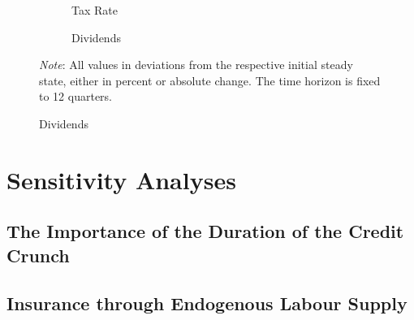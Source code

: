 \documentclass[12pt]{article} %
\numberwithin{equation}{section} %
\begin{document}
\begin{figure}[H]
    \ContinuedFloat
    \caption*{Figure {\hypersetup{hidelinks}\ref{fig:baseline-permanent-limit-agg}} Continued}
    \centering
    \begin{subfigure}[b]{0.49\textwidth}
    \caption{Tax Rate}
         \centering
         
     \end{subfigure}
     \hfill
     \begin{subfigure}[b]{0.49\textwidth}
     \caption{Dividends}
         \centering
         
     \end{subfigure}
     \begin{flushleft}
     \footnotesize
	\textit{Note}: All values in deviations from the respective initial steady state, either in percent or absolute change. The time horizon is fixed to 12 quarters.
	\end{flushleft}
\end{figure}


\section{Sensitivity Analyses}
\label{sec:sensitivity}

\subsection{The Importance of the Duration of the Credit Crunch}
\label{sec:sensitivity-persistence}

\subsection{Insurance through Endogenous Labour Supply}
\label{sec:sensitivity-end-labour}
\end{document}

